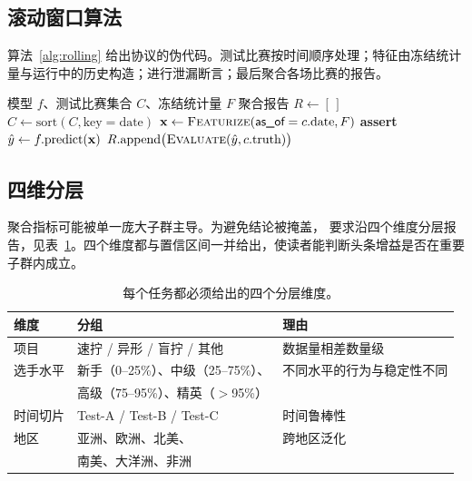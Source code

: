 \subsection{滚动窗口算法}
\label{sec:protocol-algorithm}

算法~\ref{alg:rolling} 给出协议的伪代码。测试比赛按时间顺序处理；特征由冻结统计量与运行中的历史构造；进行泄漏断言；最后聚合各场比赛的报告。

\begin{algorithm}[t]
\caption{带冻结统计量的滚动窗口评估。}
\label{alg:rolling}
\begin{algorithmic}[1]
\Require 模型 $f$、测试比赛集合 $C$、冻结统计量 $F$
\Ensure 聚合报告
\State $R \gets [\,]$
\State $C \gets \mathrm{sort}(C, \text{key} = \text{date})$ 
    \State $\mathbf{x} \gets \textsc{Featurize}(\textsf{as\_of} = c.\text{date}, F)$
    \State \textbf{assert} 
    \State $\hat{y} \gets f.\mathrm{predict}(\mathbf{x})$
    \State $R.\mathrm{append}\big(\textsc{Evaluate}(\hat{y}, c.\text{truth})\big)$
\EndFor
\State \Return {}
\end{algorithmic}
\end{algorithm}

\subsection{四维分层}
\label{sec:protocol-stratification}

聚合指标可能被单一庞大子群主导。为避免结论被掩盖，\wcabench{} 要求沿四个维度分层报告，见表~\ref{tab:strat}。四个维度都与置信区间一并给出，使读者能判断头条增益是否在重要子群内成立。

\begin{table}[t]
  \centering
  \small
  \begin{threeparttable}
  \caption{每个任务都必须给出的四个分层维度。}
  \label{tab:strat}
  \begin{tabular}{@{}lll@{}}
    \toprule
    维度 & 分组 & 理由 \\
    \midrule
    项目 & 速拧 / 异形 / 盲拧 / 其他 & 数据量相差数量级 \\
    选手水平 & 新手（0--25\%）、中级（25--75\%）、 & 不同水平的行为与稳定性不同 \\
             & 高级（75--95\%）、精英（$>$95\%） & \\
    时间切片 & Test-A / Test-B / Test-C & 时间鲁棒性 \\
    地区 & 亚洲、欧洲、北美、 & 跨地区泛化 \\
         & 南美、大洋洲、非洲 & \\
    \bottomrule
  \end{tabular}
  \end{threeparttable}
\end{table}

